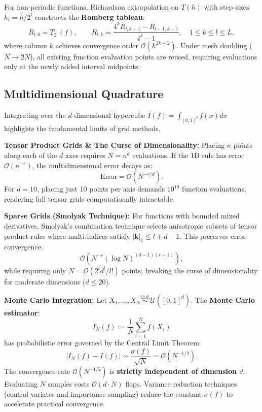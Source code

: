 For non-periodic functions, Richardson extrapolation on $T(h)$ with step sizes $h_l = h/2^l$ constructs the \textbf{Romberg tableau}:
\begin{equation}
    R_{l,0} = T_{2^l}(f), \qquad R_{l,k} = \frac{4^k R_{l,k-1} - R_{l-1,k-1}}{4^k - 1}, \quad 1 \le k \le l \le L,
\end{equation}
where column $k$ achieves convergence order $\mathcal{O}(h^{2k+2})$. Under mesh doubling ($N \to 2N$), all existing function evaluation points are reused, requiring evaluations only at the newly added interval midpoints.

\subsection{Multidimensional Quadrature}

Integrating over the $d$-dimensional hypercube $I(f) = \int_{[0, 1]^d} f(x) dx$ highlights the fundamental limits of grid methods.

\textbf{Tensor Product Grids \& The Curse of Dimensionality:} Placing $n$ points along each of the $d$ axes requires $N = n^d$ evaluations. If the 1D rule has error $\mathcal{O}(n^{-r})$, the multidimensional error decays as:
\begin{equation}
    \text{Error} = \mathcal{O}\left( N^{-r/d} \right).
\end{equation}
For $d = 10$, placing just 10 points per axis demands $10^{10}$ function evaluations, rendering full tensor grids computationally intractable.

\textbf{Sparse Grids (Smolyak Technique):} For functions with bounded mixed derivatives, Smolyak's combination technique selects anisotropic subsets of tensor product rules where multi-indices satisfy $|\mathbf{k}|_1 \le l + d - 1$. This preserves error convergence:
\begin{equation}
    \mathcal{O}\left( N^{-r} (\log N)^{(d-1)(r+1)} \right),
\end{equation}
while requiring only $N = \mathcal{O}(2^l d^l / l!)$ points, breaking the curse of dimensionality for moderate dimensions ($d \le 20$).

\textbf{Monte Carlo Integration:} Let $X_1, \dots, X_N \overset{\text{i.i.d.}}{\sim} \mathcal{U}([0, 1]^d)$. The \textbf{Monte Carlo estimator}:
\begin{equation}
    I_N(f) := \frac{1}{N} \sum_{i=1}^{N} f(X_i)
\end{equation}
has probabilistic error governed by the Central Limit Theorem:
\begin{equation}
    |I_N(f) - I(f)| \sim \frac{\sigma(f)}{\sqrt{N}} = \mathcal{O}(N^{-1/2}).
\end{equation}
The convergence rate $\mathcal{O}(N^{-1/2})$ is \textbf{strictly independent of dimension $d$}. Evaluating $N$ samples costs $\mathcal{O}(d \cdot N)$ flops. Variance reduction techniques (control variates and importance sampling) reduce the constant $\sigma(f)$ to accelerate practical convergence.

